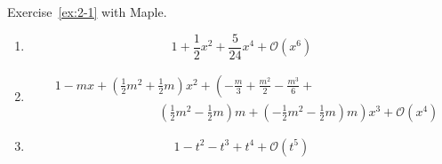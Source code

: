 \begin{exercise}
    Exercise~\ref{ex:2-1} with Maple.
\end{exercise}
\begin{solution}
    \begin{enumerate}[label=(\alph*)]
        \item \begin{mapleinput}
\end{mapleinput} \begin{mapleoutput}
    \[1+\frac{1}{2} x^{2}+\frac{5}{24} x^{4}+\mathcal{O}\left(x^{6}\right)\]
\end{mapleoutput}
        \item \begin{mapleinput}
\end{mapleinput} \begin{mapleoutput}
    \begin{align*}
        &1-m x+\left(\frac{1}{2} m^{2}+\frac{1}{2} m\right) x^{2}+\left(-\frac{m}{3}+\frac{m^{2}}{2}-\frac{m^{3}}{6}+ \right.\\ & \mspace{150mu} \left. \left(\frac{1}{2} m^{2}-\frac{1}{2} m\right) m+
        \left(-\frac{1}{2} m^{2}-\frac{1}{2} m\right) m\right) x^{3}+\mathcal{O}\left(x^{4}\right)
    \end{align*}
\end{mapleoutput}
        \item \begin{mapleinput}
\end{mapleinput} \begin{mapleoutput}
    \[1-t^{2}-t^{3}+t^{4}+\mathcal{O}\left(t^{5}\right)\]
\end{mapleoutput}
    \end{enumerate}
\end{solution}

